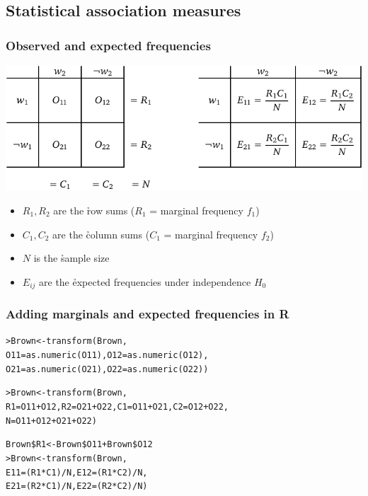 \documentclass[t]{beamer} %
\begin{document}
\subsection{Statistical association measures}

\begin{frame}
  \frametitle{Observed and expected frequencies}
  
  \begin{center}
    \includegraphics[width=\textwidth]{img/cont_table_observed_expected}
  \end{center}

  \begin{itemize}
  \item $R_1, R_2$ are the \h{row sums} ($R_1$ = marginal frequency $f_1$)
  \item $C_1, C_2$ are the \h{column sums} ($C_1$ = marginal frequency $f_2$)
  \item $N$ is the \h{sample size}
  \item $E_{ij}$ are the \h{expected frequencies} under independence $H_0$
  \end{itemize}
\end{frame}

\begin{frame}[fragile]
  \frametitle{Adding marginals and expected frequencies in R}

  \ungap[1.5]
  \begin{alltt}
> Brown <- transform(Brown,
  O11=as.numeric(O11), O12=as.numeric(O12),
  O21=as.numeric(O21), O22=as.numeric(O22))

> Brown <- transform(Brown,
  R1=O11+O12, R2=O21+O22, C1=O11+O21, C2=O12+O22,
  N=O11+O12+O21+O22)

Brown\$R1 <- Brown\$O11 + Brown\$O12 
\pause
> Brown <- transform(Brown,
  E11=(R1*C1)/N, E12=(R1*C2)/N,
  E21=(R2*C1)/N, E22=(R2*C2)/N)
  \end{alltt}
\end{frame}
\end{document}

